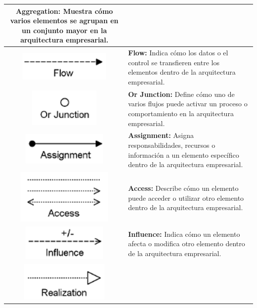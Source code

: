 \begin{longtable}{|c|p{8cm}|}
\textbf{Aggregation:} Muestra cómo varios elementos se agrupan en un conjunto mayor en la arquitectura empresarial. \\
\hline
\includegraphics{apendices/ARCHI/relations/flow.png} & 
\textbf{Flow:} Indica cómo los datos o el control se transfieren entre los elementos dentro de la arquitectura empresarial. \\
\hline
\includegraphics{apendices/ARCHI/relations/or.png} & 
\textbf{Or Junction:} Define cómo uno de varios flujos puede activar un proceso o comportamiento en la arquitectura empresarial. \\
\hline
\includegraphics{apendices/ARCHI/relations/assignment.png} & 
\textbf{Assignment:} Asigna responsabilidades, recursos o información a un elemento específico dentro de la arquitectura empresarial. \\
\hline
\includegraphics{apendices/ARCHI/relations/access.png} & 
\textbf{Access:} Describe cómo un elemento puede acceder o utilizar otro elemento dentro de la arquitectura empresarial. \\
\hline
\includegraphics{apendices/ARCHI/relations/influence.png} & 
\textbf{Influence:} Indica cómo un elemento afecta o modifica otro elemento dentro de la arquitectura empresarial. \\
\hline
\includegraphics{apendices/ARCHI/relations/realization.png} & 

\end{longtable}
